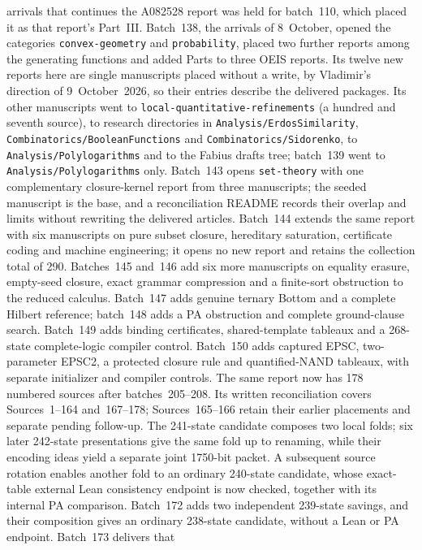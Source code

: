 \documentclass[11pt]{article}
\newcommand{\dir}[1]{\texttt{#1}}
\begin{document}
arrivals that continues the A082528 report was held for batch~110, which
placed it as that report's Part~III.
Batch~138, the arrivals of 8~October, opened the categories
\dir{convex-geometry} and \dir{probability}, placed two further reports
among the generating functions and added Parts to three OEIS reports.  Its
twelve new reports here are single manuscripts placed without a write, by
Vladimir's direction of 9~October~2026, so their entries describe the
delivered packages.  Its other manuscripts went to
\dir{local-quantitative-refinements} (a hundred and seventh source), to
research directories in \dir{Analysis/ErdosSimilarity},
\dir{Combinatorics/BooleanFunctions} and \dir{Combinatorics/Sidorenko}, to
\dir{Analysis/Polylogarithms} and to the Fabius drafts tree; batch~139
went to \dir{Analysis/Polylogarithms} only. Batch~143 opens \dir{set-theory}
with one complementary closure-kernel report from three manuscripts; the
seeded manuscript is the base, and a reconciliation README records their
overlap and limits without rewriting the delivered articles. Batch~144
extends the same report with six manuscripts on pure subset closure,
hereditary saturation, certificate coding and machine engineering; it opens
no new report and retains the collection total of 290. Batches~145 and~146
add six more manuscripts on equality erasure, empty-seed closure, exact
grammar compression and a finite-sort obstruction to the reduced calculus.
Batch~147 adds genuine ternary Bottom and a complete Hilbert reference;
batch~148 adds a PA obstruction and complete ground-clause search.
Batch~149 adds binding certificates, shared-template tableaux and a
268-state complete-logic compiler control. Batch~150 adds captured EPSC,
two-parameter EPSC2, a protected closure rule and quantified-NAND tableaux,
with separate initializer and compiler controls. The same report now has
178 numbered sources after batches~205--208. Its written reconciliation covers
Sources~1--164 and~167--178; Sources~165--166 retain their earlier placements
and separate pending follow-up. The 241-state candidate composes
two local folds; six later 242-state presentations give the same fold up
to renaming, while their encoding ideas yield a separate joint 1750-bit
packet. A subsequent source rotation enables another fold to an ordinary
240-state candidate, whose exact-table external Lean consistency endpoint is
now checked, together with its internal PA comparison. Batch~172 adds two
independent 239-state savings, and their composition gives an ordinary
238-state candidate, without a Lean or PA endpoint. Batch~173 delivers that
\end{document}
